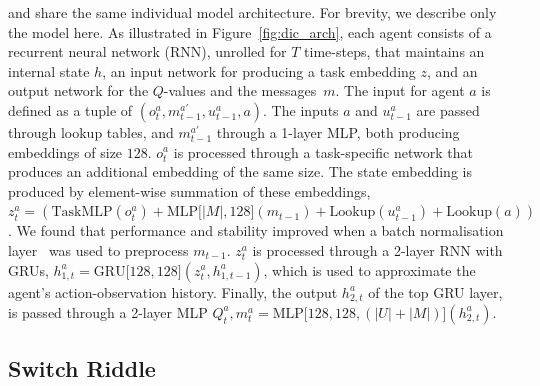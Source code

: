 \rec and \dic share the same individual model architecture. For brevity, we describe only the \dic model here. As illustrated in Figure~\ref{fig:dic_arch}, each agent consists of a recurrent neural network (RNN), unrolled for $T$ time-steps, that maintains an internal state $h$, an input network for producing a task embedding $z$, and an output network for the $Q$-values and the messages~$m$.
%
The input for agent $a$ is defined as a tuple of $(o^a_t,m^{a'}_{t-1},u^a_{t-1}, a)$. The inputs $a$ and $u^a_{t-1}$ are passed through lookup tables, and $m^{a'}_{t-1}$ through a 1-layer MLP, both producing embeddings of size $128$. $o^a_t$ is processed through a task-specific network that produces an additional embedding of the same size. The state embedding is produced by element-wise summation of these embeddings, $z^a_t = \left( \text{TaskMLP}(o^a_t) +  \text{MLP}\lbrack |M|, 128 \rbrack (m_{t-1}) + \text{Lookup}(u^a_{t-1}) + \text{Lookup}(a) \right)$. 
We found that performance and stability improved when a batch normalisation layer~\cite{ioffe2015batch} was used to preprocess $m_{t-1}$.
$z^a_t$ is processed through a 2-layer RNN with GRUs, $h^a_{1,t} = \text{GRU}\lbrack 128, 128 \rbrack (z^a_t, h^a_{1,t-1})$, which is used to approximate the agent's action-observation history. 
Finally, the output $h^a_{2,t}$ of the top GRU layer, is passed through a 2-layer MLP $Q^a_t, m^a_t = \text{MLP}\lbrack 128, 128, (|U|+|M|) \rbrack(h^a_{2,t})$.

\subsection{Switch Riddle}
\label{subsec:switch-riddle}
    
